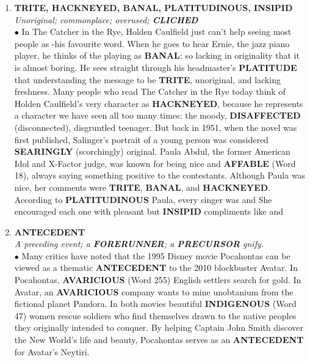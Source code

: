 \documentclass{book}
\begin{document}
\begin{enumerate}
\item \textbf{TRITE, HACKNEYED, BANAL, PLATITUDINOUS, INSIPID}\\ 
\textit{Unoriginal; commonplace; overused; \textbf{CLICHED}}\\

$\bullet$ In The Catcher in the Rye, Holden Caulfield just can't help seeing most people as -his favourite word. When he goes to hear Ernie, the jazz piano player, he thinks of the playing as \textbf{BANAL}: so lacking in originality that it is almost boring. He sees straight through his headmaster’s \textbf{PLATITUDE} that  understanding the message to be \textbf{TRITE}, unoriginal, and lacking freshness. Many people who read The Catcher in the Rye today think of Holden Caulfield’s very character as \textbf{HACKNEYED}, because he represents a character we have seen all too many times: the moody, \textbf{DISAFFECTED} (disconnected), disgruntled teenager. But back in 1951, when the novel was first published, Salinger's portrait of a young person was considered \textbf{SEARINGLY} (scorchingly) original. Paula Abdul, the former American Idol and X-Factor judge, was known for being nice and \textbf{AFFABLE} (Word 18), always saying something positive to the contestants. Although Paula was nice, her comments were \textbf{TRITE}, \textbf{BANAL}, and \textbf{HACKNEYED}. According to \textbf{PLATITUDINOUS} Paula, every singer was   and  She encouraged each one with pleasant but \textbf{INSIPID} compliments like   and 

\item \textbf{ANTECEDENT}\\
\textit{A preceding event; a \textbf{FORERUNNER}; a \textbf{PRECURSOR} gnify.}\\  

$\bullet$ Many critics have noted that the 1995 Disney movie Pocahontas can be viewed as a thematic \textbf{ANTECEDENT} to the 2010 blockbuster Avatar.  In Pocahontas, \textbf{AVARICIOUS} (Word 255) English settlers search for gold. In Avatar, an \textbf{AVARICIOUS} company wants to mine unobtanium from the fictional planet Pandora. In both movies beautiful \textbf{INDIGENOUS} (Word 47) women rescue soldiers who find themselves drawn to the native peoples they originally intended to conquer. By helping Captain John Smith discover the New World's life and beauty, Pocahontas serves as an \textbf{ANTECEDENT} for Avatar’s Neytiri.


\end{enumerate}
\end{document}
